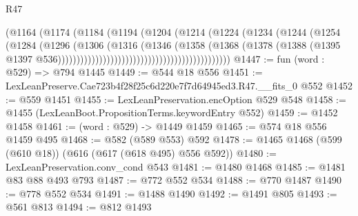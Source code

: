 \begin{lexlean}{R47}
\begin{coremodule}
                                                        (@1164
                                                          (@1174
                                                            (@1184
                                                              (@1194
                                                                (@1204
                                                                  (@1214
                                                                    (@1224
                                                                      (@1234
                                                                        (@1244
                                                                          (@1254
                                                                            (@1284
                                                                              (@1296
                                                                                (@1306
                                                                                  (@1316
                                                                                    (@1346
                                                                                      (@1358
                                                                                        (@1368
                                                                                          (@1378
                                                                                            (@1388
                                                                                              (@1395
                                                                                                @1397
                                                                                                @536))))))))))))))))))))))))))))))))))))))))))))))
@1447 := fun (word : @529) => @794 @1445
@1449 := @544 @18 @556
@1451 := LexLeanPreserve.Cae723b4f28f25c6d220e7f7d64945ed3.R47.__fits_0 @552
@1452 := @559 @1451
@1455 := LexLeanPreservation.encOption @529 @548
@1458 := @1455 (LexLeanBoot.PropositionTerms.keywordEntry @552)
@1459 := @1452 @1458
@1461 := (word : @529) -> @1449 @1459
@1465 := @574 @18 @556 @1459 @495
@1468 := @582 (@589 @553) @592
@1478 := @1465 @1468 (@599 (@610 @18)) (@616 (@617 (@618 @495) @556 @592))
@1480 := LexLeanPreservation.conv_cond @543
@1481 := @1480 @1468
@1485 := @1481 @83 @88 @493 @793
@1487 := @772 @552 @534
@1488 := @770 @1487
@1490 := @778 @552 @534
@1491 := @1488 @1490
@1492 := @1491 @805
@1493 := @561 @813
@1494 := @812 @1493

\end{coremodule}
\end{lexlean}
